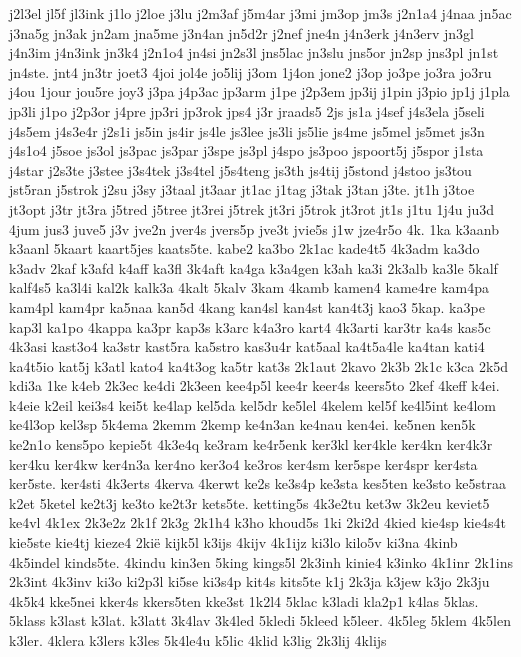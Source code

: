 {j2l3el
jl5f
jl3ink
j1lo
j2loe
j3lu
j2m3af
j5m4ar
j3mi
jm3op
jm3s
j2n1a4
j4naa
jn5ac
j3na5g
jn3ak
jn2am
jna5me
j3n4an
jn5d2r
j2nef
jne4n
j4n3erk
j4n3erv
jn3gl
j4n3im
j4n3ink
jn3k4
j2n1o4
jn4si
jn2s3l
jns5lac
jn3slu
jns5or
jn2sp
jns3pl
jn1st
jn4ste.
jnt4
jn3tr
joet3
4joi
jol4e
jo5lij
j3om
1j4on
jone2
j3op
jo3pe
jo3ra
jo3ru
j4ou
1jour
jou5re
joy3
j3pa
j4p3ac
jp3arm
j1pe
j2p3em
jp3ij
j1pin
j3pio
jp1j
j1pla
jp3li
j1po
j2p3or
j4pre
jp3ri
jp3rok
jps4
j3r
jraads5
2js
js1a
j4sef
j4s3ela
j5seli
j4s5em
j4s3e4r
j2s1i
js5in
js4ir
js4le
js3lee
js3li
js5lie
js4me
js5mel
js5met
js3n
j4s1o4
j5soe
js3ol
js3pac
js3par
j3spe
js3pl
j4spo
js3poo
jspoort5j
j5spor
j1sta
j4star
j2s3te
j3stee
j3s4tek
j3s4tel
j5s4teng
js3th
js4tij
j5stond
j4stoo
js3tou
jst5ran
j5strok
j2su
j3sy
j3taal
jt3aar
jt1ac
j1tag
j3tak
j3tan
j3te.
jt1h
j3toe
jt3opt
j3tr
jt3ra
j5tred
j5tree
jt3rei
j5trek
jt3ri
j5trok
jt3rot
jt1s
j1tu
1j4u
ju3d
4jum
jus3
juve5
j3v
jve2n
jver4s
jvers5p
jve3t
jvie5s
j1w
jze4r5o
4k.
1ka
k3aanb
k3aanl
5kaart
kaart5jes
kaats5te.
kabe2
ka3bo
2k1ac
kade4t5
4k3adm
ka3do
k3adv
2kaf
k3afd
k4aff
ka3fl
3k4aft
ka4ga
k3a4gen
k3ah
ka3i
2k3alb
ka3le
5kalf
kalf4s5
ka3l4i
kal2k
kalk3a
4kalt
5kalv
3kam
4kamb
kamen4
kame4re
kam4pa
kam4pl
kam4pr
ka5naa
kan5d
4kang
kan4sl
kan4st
kan4t3j
kao3
5kap.
ka3pe
kap3l
ka1po
4kappa
ka3pr
kap3s
k3arc
k4a3ro
kart4
4k3arti
kar3tr
ka4s
kas5c
4k3asi
kast3o4
ka3str
kast5ra
ka5stro
kas3u4r
kat5aal
ka4t5a4le
ka4tan
kati4
ka4t5io
kat5j
k3atl
kato4
ka4t3og
ka5tr
kat3s
2k1aut
2kavo
2k3b
2k1c
k3ca
2k5d
kdi3a
1ke
k4eb
2k3ec
ke4di
2k3een
kee4p5l
kee4r
keer4s
keers5to
2kef
4keff
k4ei.
k4eie
k2eil
kei3s4
kei5t
ke4lap
kel5da
kel5dr
ke5lel
4kelem
kel5f
ke4l5int
ke4lom
ke4l3op
kel3sp
5k4ema
2kemm
2kemp
ke4n3an
ke4nau
ken4ei.
ke5nen
ken5k
ke2n1o
kens5po
kepie5t
4k3e4q
ke3ram
ke4r5enk
ker3kl
ker4kle
ker4kn
ker4k3r
ker4ku
ker4kw
ker4n3a
ker4no
ker3o4
ke3ros
ker4sm
ker5spe
ker4spr
ker4sta
ker5ste.
ker4sti
4k3erts
4kerva
4kerwt
ke2s
ke3s4p
ke3sta
kes5ten
ke3sto
ke5straa
k2et
5ketel
ke2t3j
ke3to
ke2t3r
kets5te.
ketting5s
4k3e2tu
ket3w
3k2eu
keviet5
ke4vl
4k1ex
2k3e2z
2k1f
2k3g
2k1h4
k3ho
khoud5s
1ki
2ki2d
4kied
kie4sp
kie4s4t
kie5ste
kie4tj
kieze4
2kië
kijk5l
k3ijs
4kijv
4k1ijz
ki3lo
kilo5v
ki3na
4kinb
4k5indel
kinds5te.
4kindu
kin3en
5king
kings5l
2k3inh
kinie4
k3inko
4k1inr
2k1ins
2k3int
4k3inv
ki3o
ki2p3l
ki5se
ki3s4p
kit4s
kits5te
k1j
2k3ja
k3jew
k3jo
2k3ju
4k5k4
kke5nei
kker4s
kkers5ten
kke3st
1k2l4
5klac
k3ladi
kla2p1
k4las
5klas.
5klass
k3last
k3lat.
k3latt
3k4lav
3k4led
5kledi
5kleed
k5leer.
4k5leg
5klem
4k5len
k3ler.
4klera
k3lers
k3les
5k4le4u
k5lic
4klid
k3lig
2k3lij
4klijs
}

